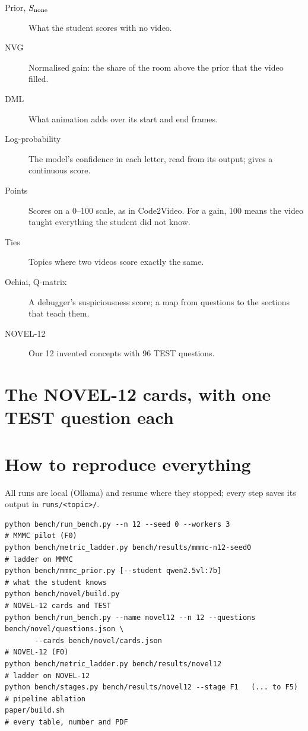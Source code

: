 \documentclass[11pt]{article}
\begin{document}
\begin{description}
  \item[Prior, $S_{\text{none}}$] What the student scores with no video.
  \item[NVG] Normalised gain: the share of the room above the prior that the video filled.
  \item[DML] What animation adds over its start and end frames.
  \item[Log-probability] The model's confidence in each letter, read from its output; gives a continuous score.
  \item[Points] Scores on a 0--100 scale, as in Code2Video. For a gain, 100 means the video taught everything the
  student did not know.
  \item[Ties] Topics where two videos score exactly the same.
  \item[Ochiai, Q-matrix] A debugger's suspiciousness score; a map from questions to the sections that teach them.
  \item[NOVEL-12] Our 12 invented concepts with 96 TEST questions.
\end{description}

\appendix
\section{The NOVEL-12 cards, with one TEST question each}\label{app:cards}


\section{How to reproduce everything}
All runs are local (Ollama) and resume where they stopped; every step saves its output in \texttt{runs/<topic>/}.
{\footnotesize
\begin{verbatim}
python bench/run_bench.py --n 12 --seed 0 --workers 3                      # MMMC pilot (F0)
python bench/metric_ladder.py bench/results/mmmc-n12-seed0                 # ladder on MMMC
python bench/mmmc_prior.py [--student qwen2.5vl:7b]                        # what the student knows
python bench/novel/build.py                                                # NOVEL-12 cards and TEST
python bench/run_bench.py --name novel12 --n 12 --questions bench/novel/questions.json \
       --cards bench/novel/cards.json                                      # NOVEL-12 (F0)
python bench/metric_ladder.py bench/results/novel12                        # ladder on NOVEL-12
python bench/stages.py bench/results/novel12 --stage F1   (... to F5)      # pipeline ablation
paper/build.sh                                                             # every table, number and PDF
\end{verbatim}}



\end{document}
